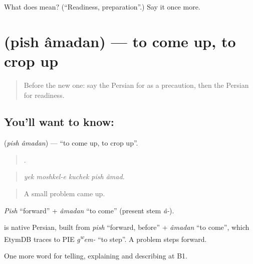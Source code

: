 \begin{tcolorbox}[breakable,colback=teal!4,colframe=teal!35!black,title={Before you move on}]
What does  mean? (\textquotedblleft{}Readiness, preparation\textquotedblright{}.) Say it once more.
\end{tcolorbox}
\section[\texorpdfstring{\fa{پیش} \fa{آمدن} (pish âmadan)}{پیش آمدن (pish âmadan)}]{  (pish âmadan) — to come up, to crop up}

\label{lesson:FA-C397-pish-amadan}



\begin{quote}
Before the new one: say the Persian for as a precaution, then the Persian for readiness.
\end{quote}

\subsection*{You'll want to know:  }
\textbf{ } (\emph{pish âmadan}) — \textquotedblleft{}to come up, to crop up\textquotedblright{}.

\begin{quote}
    .
\end{quote}

\begin{quote}
\emph{yek moshkel-e kuchek pish âmad.}
\end{quote}

\begin{quote}
A small problem came up.
\end{quote}

\emph{Pish} \textquotedblleft{}forward\textquotedblright{} + \emph{âmadan} \textquotedblleft{}to come\textquotedblright{} (present stem \emph{â-}).

\begin{cousinweb}
\textbf{ } is native Persian, built from \emph{pish} \textquotedblleft{}forward, before\textquotedblright{} + \emph{âmadan} \textquotedblleft{}to come\textquotedblright{}, which EtymDB traces to PIE \emph{g\textsuperscript{w}em-} \textquotedblleft{}to step\textquotedblright{}. A problem steps forward.
\end{cousinweb}

\begin{grammarlens}[title={What you've built}]
One more word for telling, explaining and describing at B1.
\end{grammarlens}

